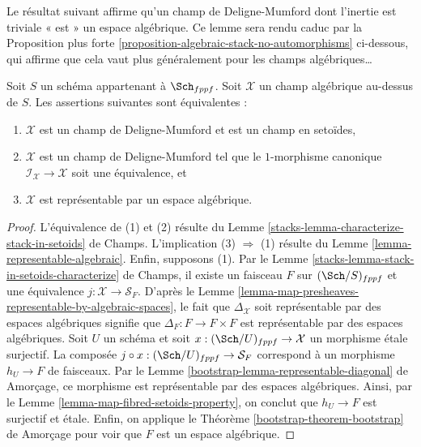 \noindent
Le résultat suivant affirme qu'un champ de Deligne-Mumford dont l'inertie
est triviale « est » un espace algébrique. Ce lemme sera rendu caduc par la
Proposition plus forte \ref{proposition-algebraic-stack-no-automorphisms}
ci-dessous, qui affirme que cela vaut plus généralement pour les champs algébriques…

\begin{lemma}
\label{lemma-algebraic-stack-no-automorphisms}
Soit $S$ un schéma appartenant à $\Sch_{fppf}$.
Soit $\mathcal{X}$ un champ algébrique au-dessus de $S$.
Les assertions suivantes sont équivalentes :
\begin{enumerate}
\item $\mathcal{X}$ est un champ de Deligne-Mumford et est un champ en setoïdes,
\item $\mathcal{X}$ est un champ de Deligne-Mumford tel que le
$1$-morphisme canonique $\mathcal{I}_\mathcal{X} \to \mathcal{X}$
soit une équivalence, et
\item $\mathcal{X}$ est représentable par un espace algébrique.
\end{enumerate}
\end{lemma}

\begin{proof}
L'équivalence de (1) et (2) résulte du
Lemme \ref{stacks-lemma-characterize-stack-in-setoids} de Champs.
L'implication (3) $\Rightarrow$ (1) résulte du
Lemme \ref{lemma-representable-algebraic}.
Enfin, supposons (1). Par le
Lemme \ref{stacks-lemma-stack-in-setoids-characterize} de Champs,
il existe un faisceau $F$ sur $(\Sch/S)_{fppf}$
et une équivalence $j : \mathcal{X} \to \mathcal{S}_F$. D'après le
Lemme \ref{lemma-map-presheaves-representable-by-algebraic-spaces},
le fait que $\Delta_\mathcal{X}$ soit représentable par des espaces
algébriques signifie que $\Delta_F : F \to F \times F$
est représentable par des espaces algébriques.
Soit $U$ un schéma et soit $x : (\Sch/U)_{fppf} \to \mathcal{X}$
un morphisme \'etale surjectif. La composée
$j \circ x : (\Sch/U)_{fppf} \to \mathcal{S}_F$
correspond à un morphisme $h_U \to F$ de faisceaux. Par le
Lemme \ref{bootstrap-lemma-representable-diagonal} de Amorçage,
ce morphisme est représentable par des espaces algébriques.
Ainsi, par le
Lemme \ref{lemma-map-fibred-setoids-property},
on conclut que $h_U \to F$ est surjectif et \'etale.
Enfin, on applique le
Théorème \ref{bootstrap-theorem-bootstrap} de Amorçage
pour voir que $F$ est un espace algébrique.
\end{proof}

